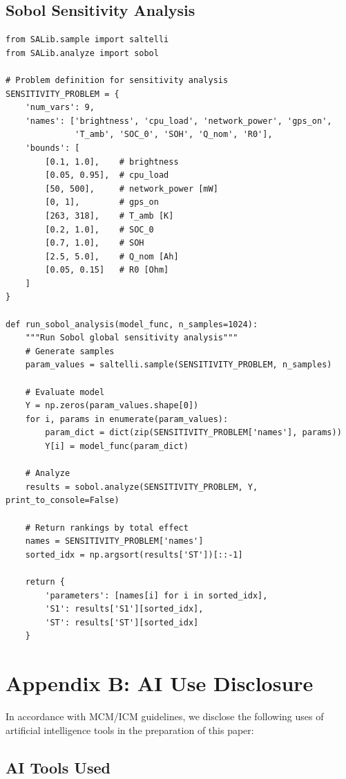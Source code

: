 \subsection{Sobol Sensitivity Analysis}

\begin{lstlisting}[caption={Sobol Sensitivity Analysis Implementation}, label={lst:sobol}]
from SALib.sample import saltelli
from SALib.analyze import sobol

# Problem definition for sensitivity analysis
SENSITIVITY_PROBLEM = {
    'num_vars': 9,
    'names': ['brightness', 'cpu_load', 'network_power', 'gps_on',
              'T_amb', 'SOC_0', 'SOH', 'Q_nom', 'R0'],
    'bounds': [
        [0.1, 1.0],    # brightness
        [0.05, 0.95],  # cpu_load
        [50, 500],     # network_power [mW]
        [0, 1],        # gps_on
        [263, 318],    # T_amb [K]
        [0.2, 1.0],    # SOC_0
        [0.7, 1.0],    # SOH
        [2.5, 5.0],    # Q_nom [Ah]
        [0.05, 0.15]   # R0 [Ohm]
    ]
}

def run_sobol_analysis(model_func, n_samples=1024):
    """Run Sobol global sensitivity analysis"""
    # Generate samples
    param_values = saltelli.sample(SENSITIVITY_PROBLEM, n_samples)
    
    # Evaluate model
    Y = np.zeros(param_values.shape[0])
    for i, params in enumerate(param_values):
        param_dict = dict(zip(SENSITIVITY_PROBLEM['names'], params))
        Y[i] = model_func(param_dict)
    
    # Analyze
    results = sobol.analyze(SENSITIVITY_PROBLEM, Y, print_to_console=False)
    
    # Return rankings by total effect
    names = SENSITIVITY_PROBLEM['names']
    sorted_idx = np.argsort(results['ST'])[::-1]
    
    return {
        'parameters': [names[i] for i in sorted_idx],
        'S1': results['S1'][sorted_idx],
        'ST': results['ST'][sorted_idx]
    }
\end{lstlisting}

\newpage
\section{Appendix B: AI Use Disclosure}
\label{app:ai}

In accordance with MCM/ICM guidelines, we disclose the following uses of artificial intelligence tools in the preparation of this paper:

\subsection{AI Tools Used}


